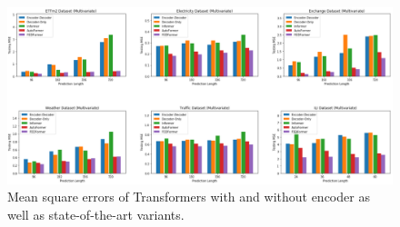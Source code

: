 \begin{figure}
    \centering
    \includegraphics[width=\textwidth]{img/mse_noenc.png}
    \caption{Mean square errors of Transformers with and without encoder as well as state-of-the-art variants.}
    \label{fig:mse_noenc}
\end{figure}
